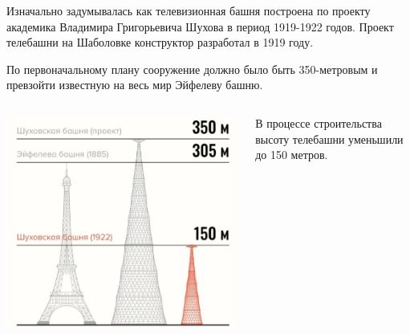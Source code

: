 \begin{frame}{}

		Изначально задумывалась как телевизионная башня построена по проекту академика Владимира Григорьевича Шухова в период 1919-1922 годов. Проект телебашни на Шаболовке конструктор разработал в 1919 году.

\end{frame}


\begin{frame}{}
		По первоначальному плану сооружение должно было быть 350-метровым и превзойти известную на весь мир Эйфелеву башню.
	\begin{columns}
		\begin{column}{0.3\textwidth}

			\includegraphics[width=1.3\textwidth]{images/tower-2}

		\end{column}


		\begin{column}{0.5\textwidth}

			В процессе строительства высоту телебашни уменьшили до 150 метров.

		\end{column}
	\end{columns}



\end{frame}


